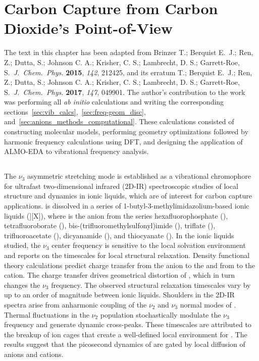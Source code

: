 \chapter[Anion Dependence]{Carbon Capture from Carbon Dioxide's Point-of-View}
\label{ch:anions}
The text in this chapter has been adapted from Brinzer T.; Berquist E.\ J.; Ren, Z.; Dutta, S.; Johnson C. A.; Krisher, C. S.; Lambrecht, D. S.; Garrett-Roe, S.\ \textit{J.\ Chem.\ Phys.} \textbf{2015}, \textit{142}, 212425, and its erratum T.; Berquist E.\ J.; Ren, Z.; Dutta, S.; Johnson C. A.; Krisher, C. S.; Lambrecht, D. S.; Garrett-Roe, S.\ \textit{J.\ Chem.\ Phys.} \textbf{2017}, \textit{147}, 049901. The author's contribution to the work was performing all \textit{ab initio} calculations and writing the corresponding sections~\ref{sec:vib_calcs},~\ref{sec:freq-geom_disc}, and~\ref{sec:anions_methods_computational}. These calculations consisted of constructing molecular models, performing geometry optimizations followed by harmonic frequency calculations using DFT, and designing the application of ALMO-EDA to vibrational frequency analysis.

\section{\texorpdfstring{}{Summary}}
\label{sec:anions_summary}
The  \(\nu_3\) asymmetric stretching mode is established as a vibrational chromophore for ultrafast two-dimensional infrared (2D-IR) spectroscopic studies of local structure and dynamics in ionic liquids, which are of interest for carbon capture applications.  is dissolved in a series of 1-butyl-3-methylimidazolium-based ionic liquids (\ce{[Im_{4,1}}][X]), where \ce{[X]-} is the anion from the series hexafluorophosphate (), tetrafluoroborate (), bis-(trifluoromethyl\-sulfonyl)imide (), triflate (), trifluoroacetate (), dicyanamide (), and thiocyanate (). In the ionic liquids studied, the \(\nu_3\) center frequency is sensitive to the local solvation environment and reports on the timescales for local structural relaxation. Density functional theory calculations predict charge transfer from the anion to the  and from  to the cation. The charge transfer drives geometrical distortion of , which in turn changes the \(\nu_3\) frequency. The observed structural relaxation timescales vary by up to an order of magnitude between ionic liquids. Shoulders in the 2D-IR spectra arise from anharmonic coupling of the \(\nu_2\) and \(\nu_3\) normal modes of . Thermal fluctuations in the \(\nu_2\) population stochastically modulate the \(\nu_3\) frequency and generate dynamic cross-peaks. These timescales are attributed to the breakup of ion cages that create a well-defined local environment for . The results suggest that the picosecond dynamics of  are gated by local diffusion of anions and cations.

